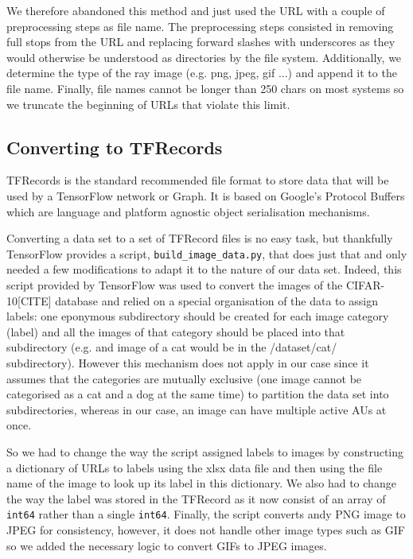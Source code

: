 \documentclass[12pt,twoside]{article}
\begin{document}
We therefore abandoned this method and just used the URL with a couple of preprocessing steps as file name. The preprocessing steps consisted in removing full stops from the URL and replacing forward slashes with underscores as they would otherwise be understood as directories by the file system. Additionally, we determine the type of the ray image (e.g. png, jpeg, gif ...) and append it to the file name. Finally, file names cannot be longer than 250 chars on most systems so we truncate the beginning of URLs that violate this limit.

\subsection{Converting to TFRecords}

TFRecords is the standard recommended file format to store data that will be used by a TensorFlow network or Graph. It is based on Google's Protocol Buffers which are language and platform agnostic object serialisation mechanisms. 

Converting a data set to a set of TFRecord files is no easy task, but thankfully TensorFlow provides a script, \texttt{build\_image\_data.py}, that does just that and only needed a few modifications to adapt it to the nature of our data set. Indeed, this script provided by TensorFlow was used to convert the images of the CIFAR-10[CITE] database and relied on a special organisation of the data to assign labels: one eponymous subdirectory should be created for each image category (label) and all the images of that category should be placed into that subdirectory (e.g. and image of a cat would be in the /dataset/cat/ subdirectory). However this mechanism does not apply in our case since it assumes that the categories are mutually exclusive (one image cannot be categorised as a cat and a dog at the same time) to partition the data set into subdirectories, whereas in our case, an image can have multiple active AUs at once.

So we had to change the way the script assigned labels to images by constructing a dictionary of URLs to labels using the xlsx data file and then using the file name of the image to look up its label in this dictionary. We also had to change the way the label was stored in the TFRecord as it now consist of an array of \texttt{int64} rather than a single \texttt{int64}. Finally, the script converts andy PNG image to JPEG for consistency, however, it does not handle other image types such as GIF so we added the necessary logic to convert GIFs to JPEG images.
\end{document}
